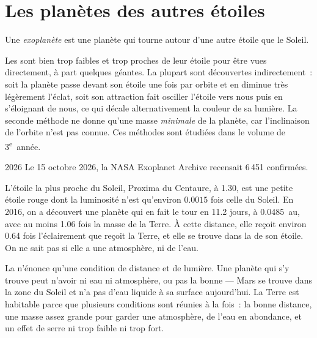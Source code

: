 \section{Les planètes des autres étoiles}

\begin{definition}[Exoplanète]\label{def:g10:habitable-planet:exoplanet}
Une \emph{exoplanète} est une planète qui tourne
autour d'une autre étoile que le Soleil.
\end{definition}

Les  sont bien trop faibles et trop proches de leur étoile pour
être vues directement, à part quelques géantes. La plupart sont découvertes
indirectement~: soit la planète passe devant son étoile une fois par orbite
et en diminue très légèrement l'éclat, soit son attraction fait osciller
l'étoile vers nous puis en s'éloignant de nous, ce qui décale alternativement
la couleur de sa lumière. La seconde méthode ne donne qu'une masse
\emph{minimale} de la planète, car l'inclinaison de l'orbite n'est pas
connue. Ces méthodes sont étudiées dans le volume de 3\textsuperscript{e}~année.

\begin{dated}{2026}
Le 15 octobre 2026, la NASA Exoplanet Archive recensait 6\,451 
confirmées.
\end{dated}

\begin{example}[Proxima b]\label{ex:g10:habitable-planet:proxima}
L'étoile la plus proche du Soleil, Proxima du Centaure, à
\qty{1.30}{\parsec}, est une petite étoile rouge dont la luminosité n'est
qu'environ $0.0015$ fois celle du Soleil. En 2016, on a découvert une
planète qui en fait le tour en 11.2 jours, à \qty{0.0485}{au}, avec au moins
1.06 fois la masse de la Terre. À cette distance, elle reçoit environ 0.64
fois l'éclairement que reçoit la Terre, et elle se trouve dans la  de son étoile. On ne sait pas si elle a une atmosphère, ni de
l'eau.
\end{example}

\begin{remark}\label{rem:g10:habitable-planet:inhabited}
La  n'énonce qu'une condition de distance et de lumière. Une
planète qui s'y trouve peut n'avoir ni eau ni atmosphère, ou pas la bonne
--- Mars se trouve dans la zone du Soleil et n'a pas d'eau liquide à sa
surface aujourd'hui. La Terre est habitable parce que plusieurs conditions
sont réunies à la fois~: la bonne distance, une masse assez grande pour
garder une atmosphère, de l'eau en abondance, et un effet de serre ni trop
faible ni trop fort.
\end{remark}

